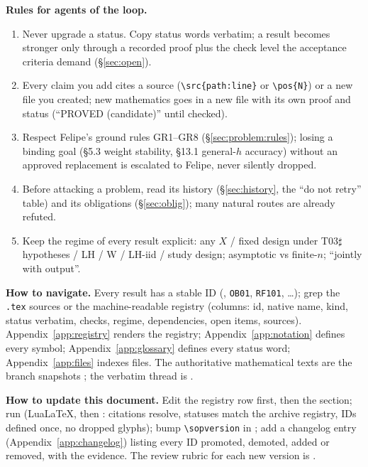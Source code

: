 \textbf{Rules for agents of the loop.}
\begin{enumerate}[label=R\arabic*.]
\item Never upgrade a status. Copy status words verbatim; a result becomes stronger only through a recorded proof plus the check level the acceptance criteria demand (\S\ref{sec:open}).
\item Every claim you add cites a source (\verb|\src{path:line}| or \verb|\pos{N}|) or a new file you created; new mathematics goes in a new file with its own proof and status (``PROVED (candidate)'' until checked).
\item Respect Felipe's ground rules GR1--GR8 (\S\ref{sec:problem:rules}); losing a binding goal (§5.3 weight stability, §13.1 general-$h$ accuracy) without an approved replacement is escalated to Felipe, never silently dropped.
\item Before attacking a problem, read its history (\S\ref{sec:history}, the ``do not retry'' table) and its obligations (\S\ref{sec:oblig}); many natural routes are already refuted.
\item Keep the regime of every result explicit: any $X$ / fixed design under T03$\sharp$ hypotheses / LH / W / LH-iid / study design; asymptotic vs finite-$n$; ``jointly with output''.
\end{enumerate}

\textbf{How to navigate.} Every result has a stable ID (, \texttt{OB01}, \texttt{RF101}, \ldots); grep the \texttt{.tex} sources or the machine-readable registry  (columns: id, native name, kind, status verbatim, checks, regime, dependencies, open items, sources). Appendix~\ref{app:registry} renders the registry; Appendix~\ref{app:notation} defines every symbol; Appendix~\ref{app:glossary} defines every status word; Appendix~\ref{app:files} indexes files. The authoritative mathematical texts are the branch snapshots ; the verbatim thread is .

\textbf{How to update this document.} Edit the registry row first, then the section; run  (LuaLaTeX, then : citations resolve, statuses match the archive registry, IDs defined once, no dropped glyphs); bump \verb|\sopversion| in ; add a changelog entry (Appendix~\ref{app:changelog}) listing every ID promoted, demoted, added or removed, with the evidence. The review rubric for each new version is .
